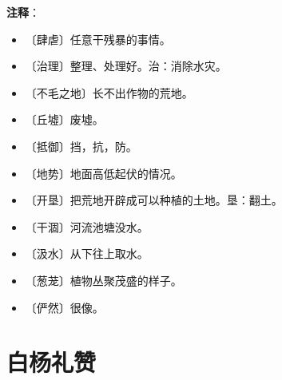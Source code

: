 \documentclass[12pt,UTF-8,openany]{ctexbook}
\begin{document}
\newpage

\textbf{注释}：

\vspace{-1em}

\begin{itemize}
    \setlength\itemsep{-0.2em}
    \item 〔肆虐〕任意干残暴的事情。
    \item 〔治理〕整理、处理好。治：消除水灾。
    \item 〔不毛之地〕长不出作物的荒地。
    \item 〔丘墟〕废墟。
    \item 〔抵御〕挡，抗，防。
    \item 〔地势〕地面高低起伏的情况。
    \item 〔开垦〕把荒地开辟成可以种植的土地。垦：翻土。
    \item 〔干涸〕河流池塘没水。
    \item 〔汲水〕从下往上取水。
    \item 〔葱茏〕植物丛聚茂盛的样子。
    \item 〔俨然〕很像。
\end{itemize}

\chapter{白杨礼赞}
\end{document}
